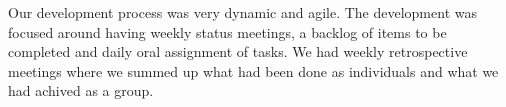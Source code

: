 Our development process was very dynamic and agile.
The development was focused around having weekly status meetings, a backlog of items to be completed and daily oral assignment of tasks.
We had weekly retrospective meetings where we summed up what had been done as individuals and what we had achived as a group.